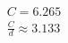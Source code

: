\documentclass[preview]{standalone}
\begin{document}
\begin{align*}
C = 6.265 \\\frac{C}{d} \approx 3.133
\end{align*}
\end{document}
